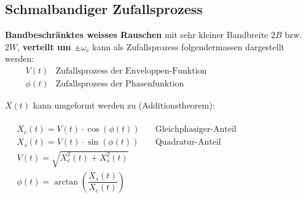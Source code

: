 			\subsection{Schmalbandiger Zufallsprozess}\label{schmalband ZP}
				\textbf{Bandbeschränktes weisses Rauschen} mit sehr kleiner Bandbreite $2B$ bzw. $2W$, \textbf{verteilt um $\pm\omega_c$} kann als Zufallsprozess folgendermassen dargestellt werden:\\[0.2cm]
				 $\qquad\begin{array}{ll} V(t) & \text{Zufallsprozess der Enveloppen-Funktion}\\\phi(t) & \text{Zufallsprozess der Phasenfunktion}\end{array}$\\[0.2cm]
				\begin{minipage}{0.55\textwidth}
					$X(t)$ kann umgeformt werden zu (Additionstheorem):\\[0.2cm]
					\\[0.2cm]
					$\quad\begin{array}{ll} X_c(t) = V(t)\cdot\cos(\phi(t)) & \quad\text{Gleichphasiger-Anteil}\\[0.2cm] X_s(t) = V(t)\cdot\sin(\phi(t)) & \quad\text{Quadratur-Anteil}\\[0.2cm] V(t) = \sqrt{X_c^2(t) + X_s^2(t)} & \\[0.2cm] \phi(t) = \arctan \left(\dfrac{X_s(t)}{X_c(t)}\right)& \end{array}$
				\end{minipage}
